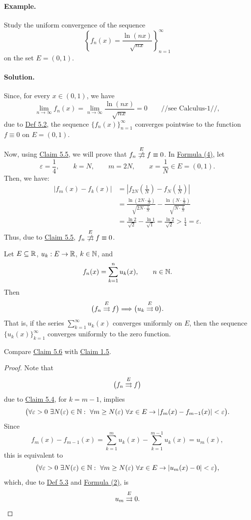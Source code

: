 \paragraph{Example.}
Study the uniform convergence of the sequence
\[
\left\{f_n(x)=\frac{\ln(nx)}{\sqrt{nx}}\right\}_{n=1}^{\infty}
\]
on the set $E=(0,1)$.

\paragraph{Solution.}
Since, for every $x\in(0,1)$, we have
\[
\lim_{n\to\infty}f_n(x)=\lim_{n\to\infty}\frac{\ln(nx)}{\sqrt{nx}}=0
\qquad\text{//see Calculus-1//},
\]
due to \hyperref[def:5.2]{Def 5.2}, the sequence $\{f_n(x)\}_{n=1}^{\infty}$ converges pointwise to the function $f\equiv0$ on $E=(0,1)$.

Now, using \hyperref[claim:5.5]{Claim 5.5}, we will prove that $f_n\nuconv{E}f\equiv0$.
In \hyperref[eq:5:4:1]{Formula (4)}, let
\[
\varepsilon=\frac14,\qquad k=N,\qquad m=2N,\qquad x=\frac1N\in E=(0,1).
\]
Then, we have:
\begin{align*}
|f_m(x)-f_k(x)|
&=\left|f_{2N}\left(\frac1N\right)-f_N\left(\frac1N\right)\right|\\
&=\frac{\ln(2N\cdot\frac1N)}{\sqrt{2N\cdot\frac1N}}
-\frac{\ln(N\cdot\frac1N)}{\sqrt{N\cdot\frac1N}}\\
&=\frac{\ln2}{\sqrt2}-\frac{\ln1}{\sqrt1}
=\frac{\ln2}{\sqrt2}>\frac14=\varepsilon.
\end{align*}
Thus, due to \hyperref[claim:5.5]{Claim 5.5}, $f_n\nuconv{E}f\equiv0$.

\begin{claim}\label{claim:5.6}
Let $E\subseteq\mathbb{R}$, $u_k:E\to\mathbb{R}$, $k\in\mathbb{N}$, and
\[
f_n(x)=\sum_{k=1}^{n}u_k(x),\qquad n\in\mathbb{N}.
\]
Then
\[
\bigl(f_n\mathrel{\overset{E}{\rightrightarrows}}f\bigr)\Longrightarrow\bigl(u_k\mathrel{\overset{E}{\rightrightarrows}}0\bigr).
\]
That is, if the series $\displaystyle\sum_{k=1}^{\infty}u_k(x)$ converges uniformly on $E$, then the sequence $\{u_k(x)\}_{k=1}^{\infty}$ converges uniformly to the zero function.

Compare \hyperref[claim:5.6]{Claim 5.6} with \hyperref[claim:1.5]{Claim 1.5}.
\end{claim}

\begin{proof}
Note that
\[
\bigl(f_n\mathrel{\overset{E}{\rightrightarrows}}f\bigr)
\]
due to \hyperref[claim:5.4]{Claim 5.4}, for $k=m-1$, implies
\[
\bigl(\forall\varepsilon>0\ \exists N(\varepsilon)\in\N:\ \forall m\ge N(\varepsilon)\ \forall x\in E
\to |f_m(x)-f_{m-1}(x)|<\varepsilon\bigr).
\]
Since
\[
f_m(x)-f_{m-1}(x)
=\sum_{k=1}^{m}u_k(x)-\sum_{k=1}^{m-1}u_k(x)=u_m(x),
\]
this is equivalent to
\[
\bigl(\forall\varepsilon>0\ \exists N(\varepsilon)\in\mathbb{N}:\ \forall m\ge N(\varepsilon)\ \forall x\in E
\to |u_m(x)-0|<\varepsilon\bigr),
\]
which, due to \hyperref[def:5.3]{Def 5.3} and \hyperref[eq:5:2:1]{Formula (2)}, is
\[
u_m\mathrel{\overset{E}{\rightrightarrows}}0.
\]
\end{proof}

